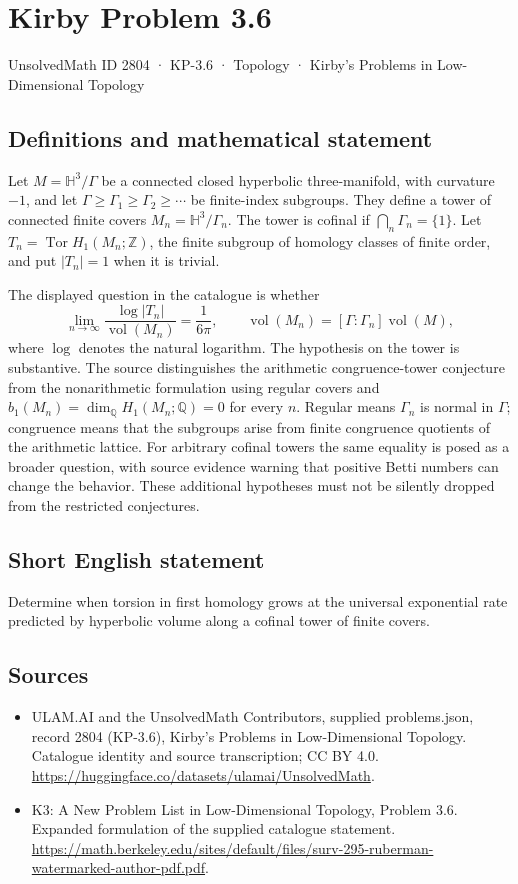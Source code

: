 \documentclass[11pt,a4paper]{article}
\begin{document}
\section*{Kirby Problem 3.6}\label{2804}
{\small UnsolvedMath ID 2804 · KP-3.6 · Topology · Kirby's Problems in Low-Dimensional Topology}
\subsection{Definitions and mathematical statement}
Let $M=\mathbb H^3/\Gamma$ be a connected closed hyperbolic three-manifold,
with curvature $-1$, and let $\Gamma\geq\Gamma_1\geq\Gamma_2\geq\cdots$
be finite-index subgroups. They define a tower of connected finite covers
$M_n=\mathbb H^3/\Gamma_n$. The tower is cofinal if
$\bigcap_n\Gamma_n=\{1\}$. Let
$T_n=\operatorname{Tor}H_1(M_n;\mathbb Z)$, the finite subgroup of homology
classes of finite order, and put $|T_n|=1$ when it is trivial.

The displayed question in the catalogue is whether
\[
 \lim_{n\to\infty}
 \frac{\log|T_n|}{\operatorname{vol}(M_n)}=\frac1{6\pi},
 \qquad
 \operatorname{vol}(M_n)=[\Gamma:\Gamma_n]\operatorname{vol}(M),
\]
where $\log$ denotes the natural logarithm. The hypothesis on the tower is
substantive. The source distinguishes the arithmetic congruence-tower
conjecture from the nonarithmetic formulation using regular covers and
$b_1(M_n)=\dim_{\mathbb Q}H_1(M_n;\mathbb Q)=0$ for every $n$.
Regular means $\Gamma_n$ is normal in $\Gamma$; congruence means that the
subgroups arise from finite congruence quotients of the arithmetic lattice.
For arbitrary cofinal towers the same equality is posed as a broader question,
with source evidence warning that positive Betti numbers can change the behavior.
These additional hypotheses must not be silently dropped from the restricted conjectures.
\subsection{Short English statement}
Determine when torsion in first homology grows at the universal exponential rate predicted by hyperbolic volume along a cofinal tower of finite covers.
\subsection{Sources}
\begin{itemize}
\item[S1] ULAM.AI and the UnsolvedMath Contributors, supplied problems.json, record 2804 (KP-3.6), Kirby's Problems in Low-Dimensional Topology. Catalogue identity and source transcription; CC BY 4.0.
\url{https://huggingface.co/datasets/ulamai/UnsolvedMath}.
\item[S2] K3: A New Problem List in Low-Dimensional Topology, Problem 3.6. Expanded formulation of the supplied catalogue statement.
\url{https://math.berkeley.edu/sites/default/files/surv-295-ruberman-watermarked-author-pdf.pdf}.
\end{itemize}
\end{document}
